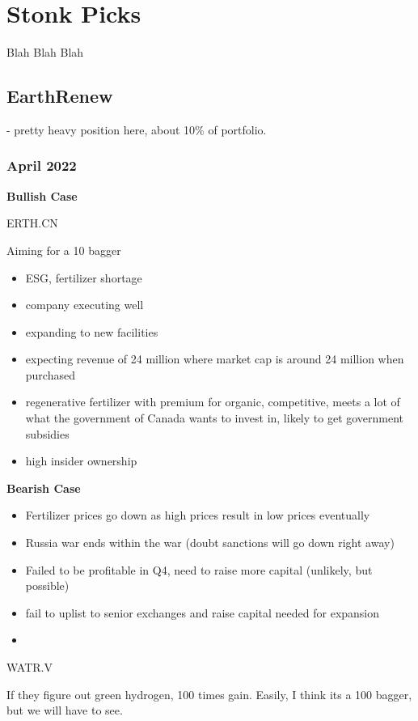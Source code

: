 \chapter{Stonk Picks}

Blah Blah Blah


\section{EarthRenew}

- pretty heavy position here, about 10\% of portfolio.

\subsection{April 2022}

\textbf{Bullish Case}

ERTH.CN

Aiming for a 10 bagger
\begin{itemize}
    \item ESG, fertilizer shortage
    \item company executing well
    \item expanding to new facilities
    \item expecting revenue of 24 million where market cap is around 24 million when purchased
    \item regenerative fertilizer with premium for organic, competitive, meets a lot of what the government of Canada wants to invest in, likely to get government subsidies
    \item high insider ownership
\end{itemize}

\textbf{Bearish Case}

\begin{itemize}
    \item Fertilizer prices go down as high prices result in low prices eventually
    \item Russia war ends within the war (doubt sanctions will go down right away)
    \item Failed to be profitable in Q4, need to raise more capital (unlikely, but possible)
    \item fail to uplist to senior exchanges and raise capital needed for expansion
    \item 
\end{itemize}


WATR.V 

If they figure out green hydrogen, 100 times gain. Easily, I think its a 100 bagger, but we will have to see.


